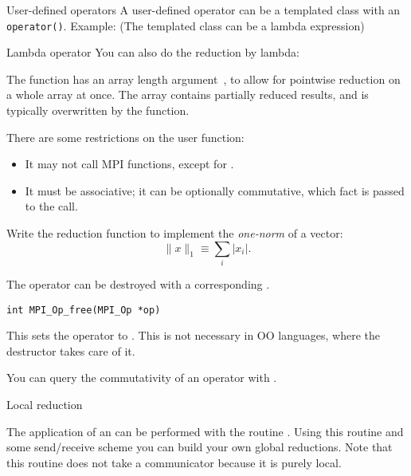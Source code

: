 \begin{mplnote}{User-defined operators}
  A user-defined operator can be a templated class with an \lstinline+operator()+.
  Example:
  (The templated class can be a lambda expression)
\end{mplnote}

\begin{mplnote}{Lambda operator}
  You can also do the reduction by lambda:
\end{mplnote}

The function has an array length argument~, to allow for
pointwise reduction on a whole array at once. The  array
contains partially reduced results, and is typically overwritten by
the function.

There are some restrictions on the user function:
\begin{itemize}
\item It may not call MPI functions, except for
  .
\item It must be associative; it can be optionally commutative, which
  fact is passed to the  call.
\end{itemize}

\begin{exercise}
  \label{ex:one-norm-op}
  Write the reduction function to implement the
  \emph{one-norm} of a vector:
  \[ \|x\|_1 \equiv \sum_i |x_i|. \]
\end{exercise}

The operator can be destroyed with a corresponding
.
\begin{lstlisting}
int MPI_Op_free(MPI_Op *op)
\end{lstlisting}
This sets the operator to .
This is not necessary in \ac{OO} languages,
where the destructor takes care of it.

You can query the commutativity of an operator with
%
.

 {Local reduction}

The application of an  can be performed with the routine
. Using this routine and some
send/receive scheme you can build your own global reductions. Note
that this routine does not take a communicator because it is purely local.

